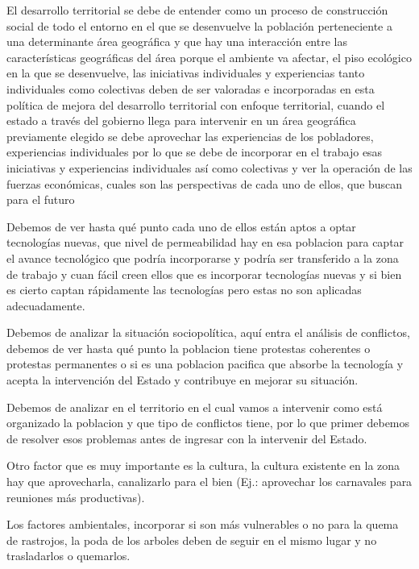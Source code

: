 \documentclass[
  a4paper,
]{article}
\begin{document}
El desarrollo territorial se debe de entender como un proceso de
construcción social de todo el entorno en el que se desenvuelve la
población perteneciente a una determinante área geográfica y que hay una
interacción entre las características geográficas del área porque el
ambiente va afectar, el piso ecológico en la que se desenvuelve, las
iniciativas individuales y experiencias tanto individuales como
colectivas deben de ser valoradas e incorporadas en esta política de
mejora del desarrollo territorial con enfoque territorial, cuando el
estado a través del gobierno llega para intervenir en un área geográfica
previamente elegido se debe aprovechar las experiencias de los
pobladores, experiencias individuales por lo que se debe de incorporar
en el trabajo esas iniciativas y experiencias individuales así como
colectivas y ver la operación de las fuerzas económicas, cuales son las
perspectivas de cada uno de ellos, que buscan para el futuro

Debemos de ver hasta qué punto cada uno de ellos están aptos a optar
tecnologías nuevas, que nivel de permeabilidad hay en esa poblacion para
captar el avance tecnológico que podría incorporarse y podría ser
transferido a la zona de trabajo y cuan fácil creen ellos que es
incorporar tecnologías nuevas y si bien es cierto captan rápidamente las
tecnologías pero estas no son aplicadas adecuadamente.

Debemos de analizar la situación sociopolítica, aquí entra el análisis
de conflictos, debemos de ver hasta qué punto la poblacion tiene
protestas coherentes o protestas permanentes o si es una poblacion
pacifica que absorbe la tecnología y acepta la intervención del Estado y
contribuye en mejorar su situación.

Debemos de analizar en el territorio en el cual vamos a intervenir como
está organizado la poblacion y que tipo de conflictos tiene, por lo que
primer debemos de resolver esos problemas antes de ingresar con la
intervenir del Estado.

Otro factor que es muy importante es la cultura, la cultura existente en
la zona hay que aprovecharla, canalizarlo para el bien (Ej.: aprovechar
los carnavales para reuniones más productivas).

Los factores ambientales, incorporar si son más vulnerables o no para la
quema de rastrojos, la poda de los arboles deben de seguir en el mismo
lugar y no trasladarlos o quemarlos.
\end{document}
